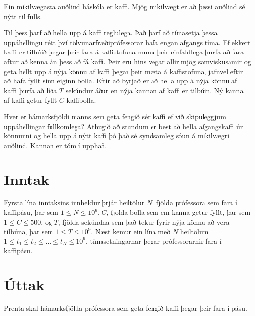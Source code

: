 
Ein mikilvægasta auðlind háskóla er kaffi.
Mjög mikilvægt er að þessi auðlind sé nýtt til fulls.

Til þess þarf að hella upp á kaffi reglulega.
Það þarf að tímasetja þessa uppáhellingu rétt því tölvunarfræðiprófessorar hafa engan afgangs tíma.
Ef ekkert kaffi er tilbúið þegar þeir fara á kaffistofuna munu þeir einfaldlega þurfa að fara aftur að kenna án þess að fá kaffi.
Þeir eru hins vegar allir mjög samviskusamir og geta hellt upp á nýja könnu af kaffi þegar þeir mæta á kaffistofuna, jafnvel eftir að hafa fyllt sinn eiginn bolla.
Eftir að byrjað er að hella upp á nýja könnu af kaffi þurfa að líða $T$ sekúndur áður en nýja kannan af kaffi er tilbúin.
Ný kanna af kaffi getur fyllt $C$ kaffibolla.

Hver er hámarksfjöldi manns sem geta fengið sér kaffi ef við skipuleggjum uppáhellingar fullkomlega?
Athugið að stundum er best að hella afgangskaffi úr könnunni og hella upp á nýtt kaffi þó það sé syndsamleg sóun á mikilvægri auðlind.
Kannan er tóm í upphafi.

\section*{Inntak}
Fyrsta lína inntaksins innheldur þrjár heiltölur $N$,
fjölda prófessora sem fara í kaffipásu, 
þar sem $1 \leq N \leq 10^6$, $C$,
fjölda bolla sem ein kanna getur fyllt,
þar sem $1 \leq C \leq 500$, og $T$,
fjölda sekúndna sem það tekur fyrir nýja könnu að vera tilbúna,
þar sem $1 \leq T \leq 10^9$.
Næst kemur ein lína með $N$ heiltölum $1 \leq t_1 \leq t_2 \leq \dots \leq t_N \leq 10^9$, tímasetningarnar þegar prófessorarnir
fara í kaffipásu.

\section*{Úttak}
Prenta skal hámarksfjölda prófessora sem geta fengið kaffi þegar þeir fara í pásu.

